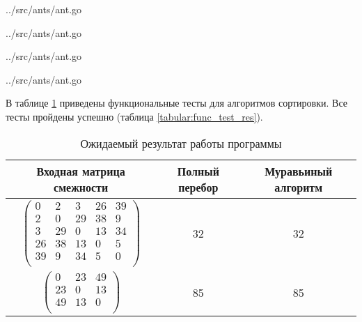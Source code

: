 \clearpage

\begin{lstinputlisting}[
	caption={Муравьиный алгоритм - Часть 2},
	label={lst:ant2},
	style={go},
	linerange={40-84},
	]{../src/ants/ant.go}
\end{lstinputlisting}
\clearpage

\begin{lstinputlisting}[
	caption={Муравьиный алгоритм - Часть 3},
	label={lst:ant3},
	style={go},
	linerange={86-128},
	]{../src/ants/ant.go}
\end{lstinputlisting}

\clearpage

\begin{lstinputlisting}[
	caption={Муравьиный алгоритм - Часть 4},
	label={lst:ant4},
	style={go},
	linerange={130-167},
	]{../src/ants/ant.go}
\end{lstinputlisting}

\clearpage

\begin{lstinputlisting}[
	caption={Муравьиный алгоритм - Часть 5},
	label={lst:ant5},
	style={go},
	linerange={169-196},
	]{../src/ants/ant.go}
\end{lstinputlisting}

В таблице \ref{tabular:func_test} приведены функциональные тесты для алгоритмов сортировки. Все тесты пройдены успешно (таблица \ref{tabular:func_test_res}).


\begin{table}[h!]
	\begin{center}
		\caption{\label{tabular:func_test}Ожидаемый результат работы программы}
		\begin{tabular}{|c|c|c|}
			\hline
			Входная матрица смежности & Полный перебор & Муравьиный алгоритм \\ 
			\hline
			$\begin{pmatrix}
			    0 &    2 &    3 &   26 &   39 \\ 
			2 &    0 &   29 &   38 &    9 \\ 
			3 &   29 &    0 &   13 &   34 \\ 
			26 &   38 &   13 &    0 &    5 \\ 
			39 &    9 &   34 &    5 &    0 \\ 
			\end{pmatrix}$ & 32 & 32	 \\\hline
			$\begin{pmatrix}
    0 &   23 &   49 \\ 
23 &    0 &   13 \\ 
49 &   13 &    0 \\ 
			\end{pmatrix}$ & 85 & 85	\\\hline
		\end{tabular}
	\end{center}
\end{table}

